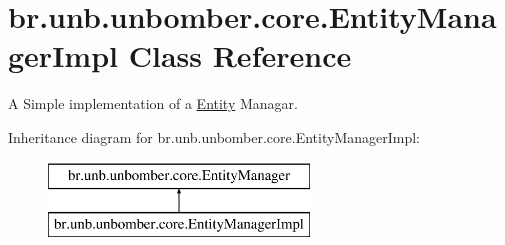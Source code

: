 \hypertarget{classbr_1_1unb_1_1unbomber_1_1core_1_1_entity_manager_impl}{\section{br.\+unb.\+unbomber.\+core.\+Entity\+Manager\+Impl Class Reference}
\label{classbr_1_1unb_1_1unbomber_1_1core_1_1_entity_manager_impl}
}


A Simple implementation of a \hyperlink{classbr_1_1unb_1_1unbomber_1_1core_1_1_entity}{Entity} Managar.  


Inheritance diagram for br.\+unb.\+unbomber.\+core.\+Entity\+Manager\+Impl\+:\begin{figure}[H]
\begin{center}
\leavevmode
\includegraphics[height=2.000000cm]{classbr_1_1unb_1_1unbomber_1_1core_1_1_entity_manager_impl}
\end{center}
\end{figure}
